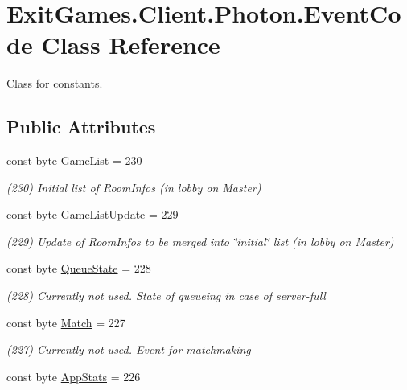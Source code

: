 \hypertarget{class_exit_games_1_1_client_1_1_photon_1_1_event_code}{}\section{Exit\+Games.\+Client.\+Photon.\+Event\+Code Class Reference}
\label{class_exit_games_1_1_client_1_1_photon_1_1_event_code}


Class for constants.  


\subsection*{Public Attributes}
\begin{DoxyCompactItemize}
\item 
const byte \hyperlink{class_exit_games_1_1_client_1_1_photon_1_1_event_code_a76ee5ffbffe8b7deeb9592635b3e2ea8}{Game\+List} = 230
\begin{DoxyCompactList}\small\item\em (230) Initial list of Room\+Infos (in lobby on Master)\end{DoxyCompactList}\item 
const byte \hyperlink{class_exit_games_1_1_client_1_1_photon_1_1_event_code_a188e6424527bad132c9d5b0bfc4e5e4d}{Game\+List\+Update} = 229
\begin{DoxyCompactList}\small\item\em (229) Update of Room\+Infos to be merged into \char`\"{}initial\char`\"{} list (in lobby on Master)\end{DoxyCompactList}\item 
const byte \hyperlink{class_exit_games_1_1_client_1_1_photon_1_1_event_code_a6fc53cb6aad4fcf42ee4b1340443d10b}{Queue\+State} = 228
\begin{DoxyCompactList}\small\item\em (228) Currently not used. State of queueing in case of server-\/full\end{DoxyCompactList}\item 
const byte \hyperlink{class_exit_games_1_1_client_1_1_photon_1_1_event_code_a4ae30567f95504ae53132588271fe8c5}{Match} = 227
\begin{DoxyCompactList}\small\item\em (227) Currently not used. Event for matchmaking\end{DoxyCompactList}\item 
const byte \hyperlink{class_exit_games_1_1_client_1_1_photon_1_1_event_code_ad91a28567590ac06accfd7ab9df53b9e}{App\+Stats} = 226

\end{DoxyCompactItemize}
